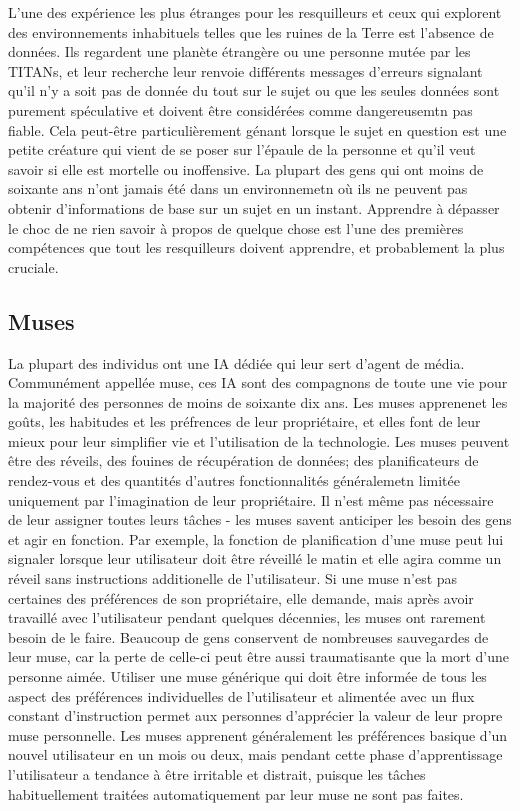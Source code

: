             L'une des expérience les plus étranges pour les resquilleurs et ceux qui explorent des environnements inhabituels telles que les ruines de la Terre est l'absence de données. Ils regardent une planète étrangère ou une personne mutée par les TITANs, et leur recherche leur renvoie différents messages d'erreurs signalant qu'il n'y a soit pas de donnée du tout sur le sujet ou que les seules données sont purement spéculative et doivent être considérées comme dangereusemtn pas fiable. Cela peut-être particulièrement génant lorsque le sujet en question est une petite créature qui vient de se poser sur l'épaule de la personne et qu'il veut savoir si elle est mortelle ou inoffensive. La plupart des gens qui ont moins de soixante ans n'ont jamais été dans un environnemetn où ils ne peuvent pas obtenir d'informations de base sur un sujet en un instant. Apprendre à dépasser le choc de ne rien savoir à propos de quelque chose est l'une des premières compétences que tout les resquilleurs doivent apprendre, et probablement la plus cruciale. 

            \subsection{Muses} \label{sec:muses} 

            La plupart des individus ont une IA dédiée qui leur sert d'agent de média. Communément appellée muse, ces IA sont des compagnons de toute une vie pour la majorité des personnes de moins de soixante dix ans. Les muses apprenenet les goûts, les habitudes et les préfrences de leur propriétaire, et elles font de leur mieux pour leur simplifier vie et l'utilisation de la technologie. Les muses peuvent être des réveils, des fouines de récupération de données; des planificateurs de rendez-vous et des quantités d'autres fonctionnalités généralemetn limitée uniquement par l'imagination de leur propriétaire. Il n'est même pas nécessaire de leur assigner toutes leurs tâches - les muses savent anticiper les besoin des gens et agir en fonction. Par exemple, la fonction de planification d'une muse peut lui signaler lorsque leur utilisateur doit être réveillé le matin et elle agira comme un réveil sans instructions additionelle de l'utilisateur. Si une muse n'est pas certaines des préférences de son propriétaire, elle demande, mais après avoir travaillé avec l'utilisateur pendant quelques décennies, les muses ont rarement besoin de le faire. Beaucoup de gens conservent de nombreuses sauvegardes de leur muse, car la perte de celle-ci peut être aussi traumatisante que la mort d'une personne aimée. Utiliser une muse générique qui doit être informée de tous les aspect des préférences individuelles de l'utilisateur et alimentée avec un flux constant d'instruction permet aux personnes d'apprécier la valeur de leur propre muse personnelle. Les muses apprenent généralement les préférences basique d'un nouvel utilisateur en un mois ou deux, mais pendant cette phase d'apprentissage l'utilisateur a tendance à être irritable et distrait, puisque les tâches habituellement traitées automatiquement par leur muse ne sont pas faites. 

